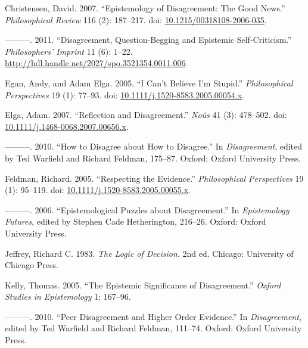 \documentclass[
  10pt,
  letterpaper,
  DIV=11,
  numbers=noendperiod,
  twoside]{scrartcl}
\newlength{\cslhangindent}
\newenvironment{CSLReferences}[2] %
 {\begin{list}{}{%
  \setlength{\itemindent}{0pt}
  \setlength{\leftmargin}{0pt}
  \setlength{\parsep}{0pt}
  \ifodd #1
   \setlength{\leftmargin}{\cslhangindent}
   \setlength{\itemindent}{-1\cslhangindent}
  \fi
  \setlength{\itemsep}{#2\baselineskip}}}
 {\end{list}}
\begin{document}
\label{refs}
\begin{CSLReferences}{1}{0}
Christensen, David. 2007. {``Epistemology of Disagreement: The Good
News.''} \emph{Philosophical Review} 116 (2): 187--217. doi:
\href{https://doi.org/10.1215/00318108-2006-035}{10.1215/00318108-2006-035}.

---------. 2011. {``Disagreement, Question-Begging and Epistemic
Self-Criticism.''} \emph{Philosophers' Imprint} 11 (6): 1--22.
\url{http://hdl.handle.net/2027/spo.3521354.0011.006}.

Egan, Andy, and Adam Elga. 2005. {``{I Can't Believe I'm Stupid}.''}
\emph{Philosophical Perspectives} 19 (1): 77--93. doi:
\href{https://doi.org/10.1111/j.1520-8583.2005.00054.x}{10.1111/j.1520-8583.2005.00054.x}.

Elga, Adam. 2007. {``Reflection and Disagreement.''} \emph{No{û}s} 41
(3): 478--502. doi:
\href{https://doi.org/10.1111/j.1468-0068.2007.00656.x}{10.1111/j.1468-0068.2007.00656.x}.

---------. 2010. {``How to Disagree about How to Disagree.''} In
\emph{Disagreement}, edited by Ted Warfield and Richard Feldman,
175--87. Oxford: Oxford University Press.

Feldman, Richard. 2005. {``Respecting the Evidence.''}
\emph{Philosophical Perspectives} 19 (1): 95--119. doi:
\href{https://doi.org/10.1111/j.1520-8583.2005.00055.x}{10.1111/j.1520-8583.2005.00055.x}.

---------. 2006. {``Epistemological Puzzles about Disagreement.''} In
\emph{Epistemology Futures}, edited by Stephen Cade Hetherington,
216--26. Oxford: Oxford University Press.

Jeffrey, Richard C. 1983. \emph{The Logic of Decision}. 2nd ed. Chicago:
University of Chicago Press.

Kelly, Thomas. 2005. {``The Epistemic Significance of Disagreement.''}
\emph{Oxford Studies in Epistemology} 1: 167--96.

---------. 2010. {``Peer Disagreement and Higher Order Evidence.''} In
\emph{Disagreement}, edited by Ted Warfield and Richard Feldman,
111--74. Oxford: Oxford University Press.


\end{CSLReferences}
\end{document}

